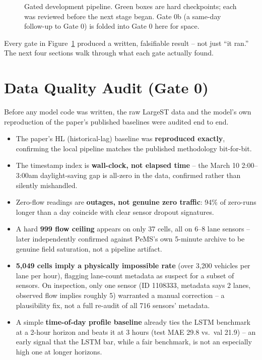 \documentclass[11pt]{article}
\begin{document}
\begin{figure}[htbp]
\caption{Gated development pipeline. Green boxes are hard checkpoints; each was reviewed before the
next stage began. Gate 0b (a same-day follow-up to Gate 0) is folded into Gate 0 here for space.}
\label{fig:pipeline}
\end{figure}

Every gate in Figure~\ref{fig:pipeline} produced a written, falsifiable result -- not just ``it
ran.'' The next four sections walk through what each gate actually found.

\section{Data Quality Audit (Gate 0)}

Before any model code was written, the raw LargeST data and the model's own reproduction of the
paper's published baselines were audited end to end.

\begin{itemize}
\item The paper's HL (historical-lag) baseline was \textbf{reproduced exactly}, confirming the
  local pipeline matches the published methodology bit-for-bit.
\item The timestamp index is \textbf{wall-clock, not elapsed time} -- the March 10 2:00--3:00am
  daylight-saving gap is all-zero in the data, confirmed rather than silently mishandled.
\item Zero-flow readings are \textbf{outages, not genuine zero traffic}: 94\% of zero-runs longer
  than a day coincide with clear sensor dropout signatures.
\item A hard \textbf{999 flow ceiling} appears on only 37 cells, all on 6--8 lane sensors --
  later independently confirmed against PeMS's own 5-minute archive to be genuine field
  saturation, not a pipeline artifact.
\item \textbf{5{,}049 cells imply a physically impossible rate} (over 3{,}200 vehicles per lane
  per hour), flagging lane-count metadata as suspect for a subset of sensors. On inspection, only
  one sensor (ID 1108333, metadata says 2 lanes, observed flow implies roughly 5) warranted a
  manual correction -- a plausibility fix, not a full re-audit of all 716 sensors' metadata.
\item A simple \textbf{time-of-day profile baseline} already ties the LSTM benchmark at a 2-hour
  horizon and beats it at 3 hours (test MAE 29.8 vs.\ val 21.9) -- an early signal that the LSTM
  bar, while a fair benchmark, is not an especially high one at longer horizons.
\end{itemize}
\end{document}
